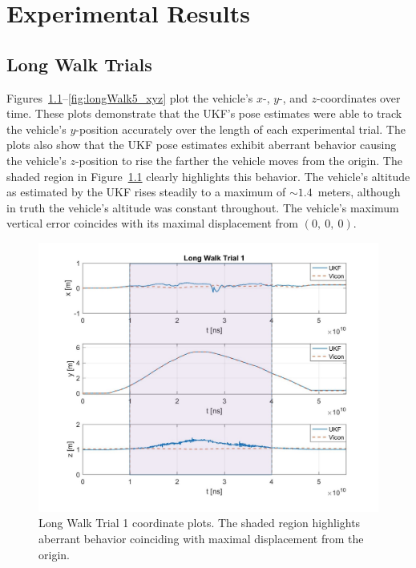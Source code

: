 \chapter{Experimental Results}

\section{Long Walk Trials}

Figures~\ref{fig:longWalk1_xyz}--\ref{fig:longWalk5_xyz} plot the vehicle's $x$-, $y$-, and $z$-coordinates over time. These plots demonstrate that the UKF's pose estimates were able to track the vehicle's $y$-position accurately over the length of each experimental trial. The plots also show that the UKF pose estimates exhibit aberrant behavior causing the vehicle's $z$-position to rise the farther the vehicle moves from the origin. The shaded region in Figure~\ref{fig:longWalk1_xyz} clearly highlights this behavior. The vehicle's altitude as estimated by the UKF rises steadily to a maximum of $\sim 1.4$~meters, although in truth the vehicle's altitude was constant throughout. The vehicle's maximum vertical error coincides with its maximal displacement from $\left( 0,\ 0,\ 0 \right)$. 

\begin{figure}
  \centering
    \includegraphics[width=\textwidth]{longWalk1_xyz}
  \caption[Long Walk Trial 1]{Long Walk Trial 1 coordinate plots. The shaded region highlights aberrant behavior coinciding with maximal displacement from the origin.}
  \label{fig:longWalk1_xyz}
\end{figure}


